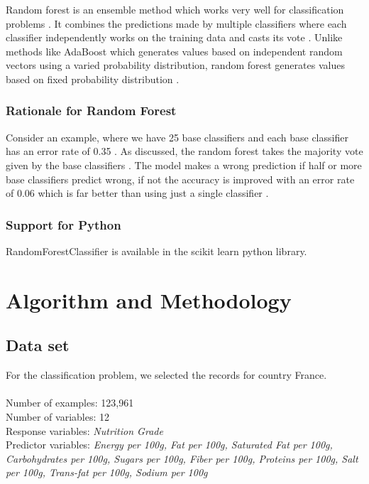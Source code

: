 \documentclass[sigconf]{acmart}
\begin{document}
Random forest is an ensemble method which works very well for classification problems \cite{book-tan}. It combines the predictions made by multiple classifiers where each classifier independently works on the training data and casts its vote \cite{book-tan}. Unlike methods like AdaBoost which generates values based on independent random vectors using a varied probability distribution, random forest generates values based on fixed probability distribution \cite{book-tan}. 

\subsubsection{Rationale for Random Forest}
Consider an example, where we have 25 base classifiers and each base classifier has an error rate of 0.35 \cite{book-tan}. As discussed, the random forest takes the majority vote given by the base classifiers \cite{book-tan}. The model makes a wrong prediction if half or more base classifiers predict wrong, if not the accuracy is improved with an error rate of 0.06 which is far better than using just a single classifier \cite{book-tan}.

\subsubsection{Support for Python} RandomForestClassifier is available in the scikit learn python library.

\section {Algorithm and Methodology}

\subsection{Data set}
For the classification problem, we selected the records for country France. \\ \\
Number of examples: 123,961 \\
Number of variables: 12 \\
Response variables: {\em Nutrition Grade} \\
Predictor variables: {\em Energy per 100g, Fat per 100g, Saturated Fat per 100g, Carbohydrates per 100g, Sugars per 100g, Fiber per 100g, Proteins per 100g, Salt per 100g, Trans-fat per 100g, Sodium per 100g}
\end{document}
